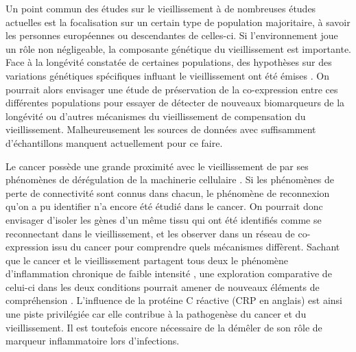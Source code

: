 Un point commun des études sur le vieillissement à de nombreuses études actuelles est la focalisation sur un certain type de population majoritaire, à savoir les personnes européennes ou descendantes de celles-ci. Si l'environnement joue un rôle non négligeable, la composante génétique du vieillissement est importante. Face à la longévité constatée de certaines populations, des hypothèses sur des variations génétiques spécifiques influant le vieillissement ont été émises \cite{Deelen2019Aug}. On pourrait alors envisager une étude de préservation de la co-expression entre ces différentes populations pour essayer de détecter de nouveaux biomarqueurs de la longévité ou d'autres mécanismes du vieillissement de compensation du vieillissement. Malheureusement les sources de données avec suffisamment d'échantillons manquent actuellement pour ce faire.

Le cancer possède une grande proximité avec le vieillissement de par ses phénomènes de dérégulation de la machinerie cellulaire \cite{Aunan2017}. Si les phénomènes de perte de connectivité sont connus dans chacun, le phénomène de reconnexion qu'on a pu identifier n'a encore été étudié dans le cancer. On pourrait donc envisager d'isoler les gènes d'un même tissu qui ont été identifiés comme se reconnectant dans le vieillissement, et les observer dans un réseau de co-expression issu du cancer pour comprendre quels mécanismes diffèrent. Sachant que le cancer et le vieillissement partagent tous deux le phénomène d'inflammation chronique de faible intensité \cite{Moreira-Pais2021Jul}, une exploration comparative de celui-ci dans les deux conditions pourrait amener de nouveaux éléments de compréhension \cite{Anglani2014}. L'influence de la protéine C réactive (CRP en anglais) est ainsi une piste privilégiée car elle contribue à la pathogenèse du cancer et du vieillissement. Il est toutefois encore nécessaire de la démêler de son rôle de marqueur inflammatoire lors d'infections.